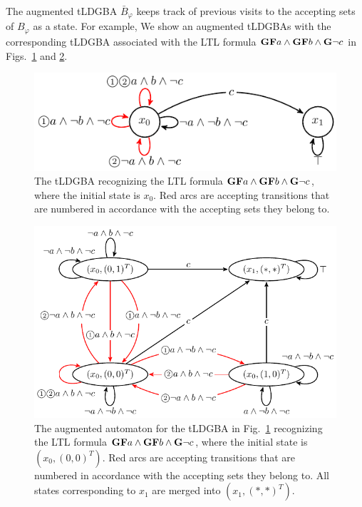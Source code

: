 \documentclass[letterpaper, 10 pt, conference]{ieeeconf}  %
\begin{document}
The augmented tLDGBA $\bar{B}_{\varphi}$ keeps track of previous visits to the accepting sets of $B_{\varphi}$ as a state. For example, We show an augmented tLDGBAs with the corresponding tLDGBA associated with the LTL formula $\text{{\bf GF}}a \land \text{{\bf GF}}b \land \text{{\bf G}}\neg c$ in Figs.\ \ref{automaton} and \ref{automaton_aug}.

\begin{figure}[htbp]
   \centering
   \vspace{2mm}
   \includegraphics[bb=0 0 247 80,scale=0.65]{ldgba_original.pdf}
   \caption{The tLDGBA recognizing the LTL formula $\text{{\bf GF}}a \wedge \text{{\bf GF}}b \wedge \text{{\bf G}}\neg c$, where the initial state is $x_0$. Red arcs are accepting transitions that are numbered in accordance with the accepting sets they belong to.}
   \label{automaton}
\end{figure}

\begin{figure}[htbp]
   \centering
   \includegraphics[bb=0 0 374 207,scale=0.6]{ldgba.pdf}
   \caption{The augmented automaton for the tLDGBA in Fig.~\ref{automaton} recognizing the LTL formula $\text{{\bf GF}}a \wedge \text{{\bf GF}}b \wedge \text{{\bf G}}\neg c$, where the initial state is $(x_0, (0,0)^T )$. Red arcs are accepting transitions that are numbered in accordance with the accepting sets they belong to. All states corresponding to $x_1$ are merged into $(x_1, (*,*)^T )$.}
   \label{automaton_aug}
\end{figure}
\end{document}
